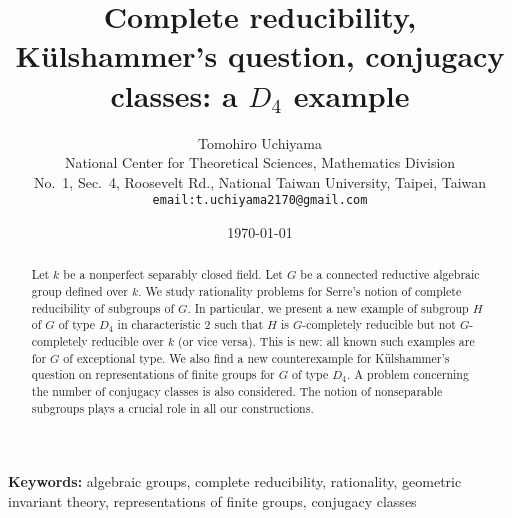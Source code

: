 \title{Complete reducibility, K\"ulshammer's question, conjugacy classes: a $D_4$ example}
\author{Tomohiro Uchiyama\\
National Center for Theoretical Sciences, Mathematics Division\\
No.~1, Sec.~4, Roosevelt Rd., National Taiwan University, Taipei, Taiwan\\
\texttt{email:t.uchiyama2170@gmail.com}}
\date{\today}
\maketitle 

\begin{abstract}
Let $k$ be a nonperfect separably closed field. Let $G$ be a connected reductive algebraic group defined over $k$. We study rationality problems for Serre's notion of complete reducibility of subgroups of $G$. In particular, we present a new example of subgroup $H$ of $G$ of type $D_4$ in characteristic $2$ such that $H$ is $G$-completely reducible but not $G$-completely reducible over $k$ (or vice versa). This is new: all known such examples are for $G$ of exceptional type. We also find a new counterexample for K\"ulshammer's question on representations of finite groups for $G$ of type $D_4$. A problem concerning the number of conjugacy classes is also considered. The notion of nonseparable subgroups plays a crucial role in all our constructions.  
\end{abstract}

\noindent \textbf{Keywords:} algebraic groups, complete reducibility, rationality, geometric invariant theory, representations of finite groups, conjugacy classes 